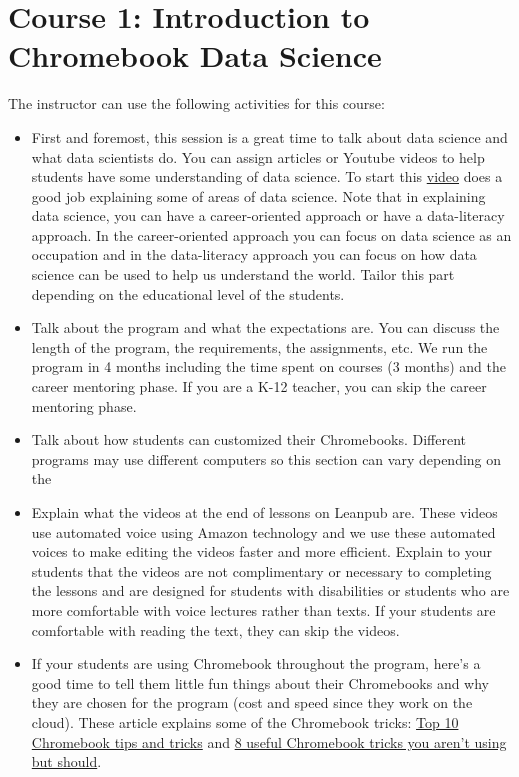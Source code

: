 \documentclass[]{book}
\begin{document}
\hypertarget{intro}{%
\chapter*{Course 1: Introduction to Chromebook Data Science}\label{intro}}

The instructor can use the following activities for this course:

\begin{itemize}
\item
  First and foremost, this session is a great time to talk about data science and what data scientists do. You can assign articles or Youtube videos to help students have some understanding of data science. To start this \href{https://www.youtube.com/watch?v=X3paOmcrTjQ}{video} does a good job explaining some of areas of data science. Note that in explaining data science, you can have a career-oriented approach or have a data-literacy approach. In the career-oriented approach you can focus on data science as an occupation and in the data-literacy approach you can focus on how data science can be used to help us understand the world. Tailor this part depending on the educational level of the students.
\item
  Talk about the program and what the expectations are. You can discuss the length of the program, the requirements, the assignments, etc. We run the program in 4 months including the time spent on courses (3 months) and the career mentoring phase. If you are a K-12 teacher, you can skip the career mentoring phase.
\item
  Talk about how students can customized their Chromebooks. Different programs may use different computers so this section can vary depending on the
\item
  Explain what the videos at the end of lessons on Leanpub are. These videos use automated voice using Amazon technology and we use these automated voices to make editing the videos faster and more efficient. Explain to your students that the videos are not complimentary or necessary to completing the lessons and are designed for students with disabilities or students who are more comfortable with voice lectures rather than texts. If your students are comfortable with reading the text, they can skip the videos.
\item
  If your students are using Chromebook throughout the program, here's a good time to tell them little fun things about their Chromebooks and why they are chosen for the program (cost and speed since they work on the cloud). These article explains some of the Chromebook tricks: \href{https://www.androidcentral.com/top-10-chromebook-tips-and-tricks}{Top 10 Chromebook tips and tricks} and \href{https://www.komando.com/tips/447946/7-useful-chromebook-tricks-you-arent-using-but-should}{8 useful Chromebook tricks you aren't using but should}.

\end{itemize}
\end{document}
